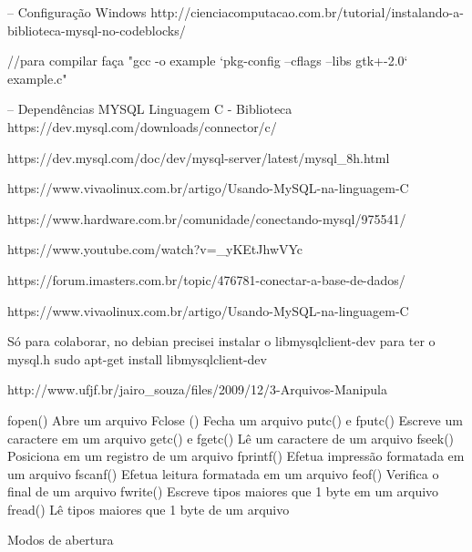 -- Configuração Windows
http://cienciacomputacao.com.br/tutorial/instalando-a-biblioteca-mysql-no-codeblocks/  

//para compilar faça "gcc -o example `pkg-config --cflags --libs gtk+-2.0` example.c"

-- Dependências MYSQL Linguagem C - Biblioteca
https://dev.mysql.com/downloads/connector/c/

https://dev.mysql.com/doc/dev/mysql-server/latest/mysql_8h.html

https://www.vivaolinux.com.br/artigo/Usando-MySQL-na-linguagem-C

https://www.hardware.com.br/comunidade/conectando-mysql/975541/

https://www.youtube.com/watch?v=_yKEtJhwVYc

https://forum.imasters.com.br/topic/476781-conectar-a-base-de-dados/

https://www.vivaolinux.com.br/artigo/Usando-MySQL-na-linguagem-C

Só para colaborar, no debian precisei instalar o libmysqlclient-dev para ter o mysql.h
sudo apt-get install libmysqlclient-dev

http://www.ufjf.br/jairo_souza/files/2009/12/3-Arquivos-Manipula%

fopen() Abre um arquivo
Fclose () Fecha um arquivo
putc() e fputc() Escreve um caractere em um arquivo
getc() e fgetc() Lê um caractere de um arquivo
fseek() Posiciona em um registro de um arquivo
fprintf() Efetua impressão formatada em um arquivo
fscanf() Efetua leitura formatada em um arquivo
feof() Verifica o final de um arquivo
fwrite() Escreve tipos maiores que 1 byte em um arquivo
fread() Lê tipos maiores que 1 byte de um arquivo

Modos de abertura

